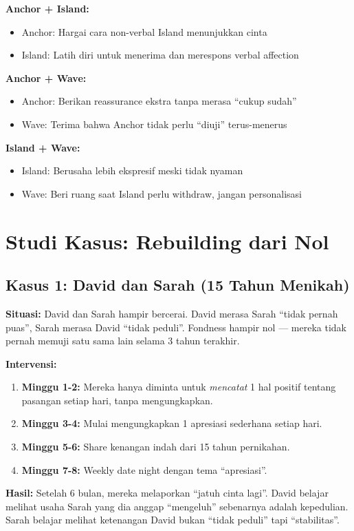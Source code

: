 \begin{tipbox}
\textbf{Anchor + Island:}
\begin{itemize}
    \item Anchor: Hargai cara non-verbal Island menunjukkan cinta
    \item Island: Latih diri untuk menerima dan merespons verbal affection
\end{itemize}

\textbf{Anchor + Wave:}
\begin{itemize}
    \item Anchor: Berikan reassurance ekstra tanpa merasa ``cukup sudah''
    \item Wave: Terima bahwa Anchor tidak perlu ``diuji'' terus-menerus
\end{itemize}

\textbf{Island + Wave:}
\begin{itemize}
    \item Island: Berusaha lebih ekspresif meski tidak nyaman
    \item Wave: Beri ruang saat Island perlu withdraw, jangan personalisasi
\end{itemize}
\end{tipbox}

\section{Studi Kasus: Rebuilding dari Nol}

\subsection{Kasus 1: David dan Sarah (15 Tahun Menikah)}

\begin{insightbox}
\textbf{Situasi:} David dan Sarah hampir bercerai. David merasa Sarah ``tidak pernah puas'', Sarah merasa David ``tidak peduli''. Fondness hampir nol --- mereka tidak pernah memuji satu sama lain selama 3 tahun terakhir.

\textbf{Intervensi:}
\begin{enumerate}
    \item \textbf{Minggu 1-2:} Mereka hanya diminta untuk \textit{mencatat} 1 hal positif tentang pasangan setiap hari, tanpa mengungkapkan.
    \item \textbf{Minggu 3-4:} Mulai mengungkapkan 1 apresiasi sederhana setiap hari.
    \item \textbf{Minggu 5-6:} Share kenangan indah dari 15 tahun pernikahan.
    \item \textbf{Minggu 7-8:} Weekly date night dengan tema ``apresiasi''.
\end{enumerate}

\textbf{Hasil:} Setelah 6 bulan, mereka melaporkan ``jatuh cinta lagi''. David belajar melihat usaha Sarah yang dia anggap ``mengeluh'' sebenarnya adalah kepedulian. Sarah belajar melihat ketenangan David bukan ``tidak peduli'' tapi ``stabilitas''.
\end{insightbox}

